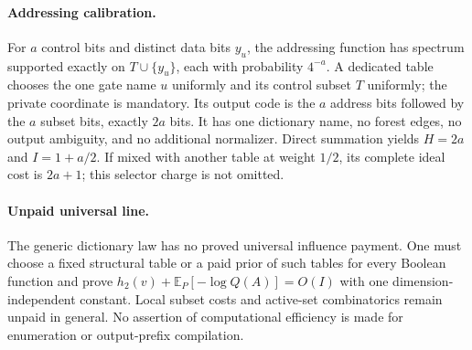 \documentclass{article}
\begin{document}
\paragraph{Addressing calibration.}
For $a$ control bits and distinct data bits $y_u$, the addressing function has spectrum supported exactly on $T\cup\{y_u\}$, each with probability $4^{-a}$. A dedicated table chooses the one gate name $u$ uniformly and its control subset $T$ uniformly; the private coordinate is mandatory. Its output code is the $a$ address bits followed by the $a$ subset bits, exactly $2a$ bits. It has one dictionary name, no forest edges, no output ambiguity, and no additional normalizer. Direct summation yields $H=2a$ and $I=1+a/2$. If mixed with another table at weight $1/2$, its complete ideal cost is $2a+1$; this selector charge is not omitted.

\paragraph{Unpaid universal line.}
The generic dictionary law has no proved universal influence payment. One must choose a fixed structural table or a paid prior of such tables for every Boolean function and prove $h_2(v)+\mathbb E_P[-\log Q(A)]=O(I)$ with one dimension-independent constant. Local subset costs and active-set combinatorics remain unpaid in general. No assertion of computational efficiency is made for enumeration or output-prefix compilation.
\end{document}
